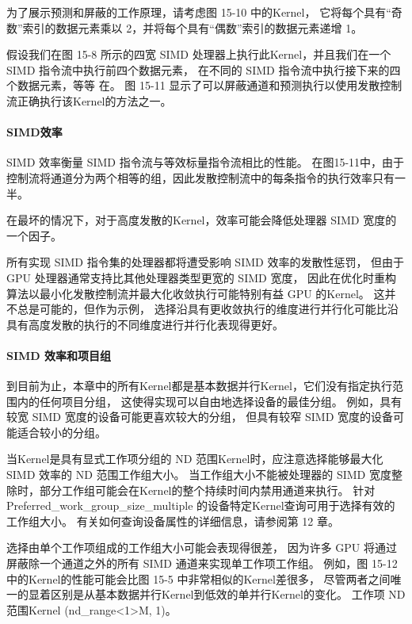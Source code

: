 为了展示预测和屏蔽的工作原理，请考虑图 15-10 中的Kernel，
它将每个具有“奇数”索引的数据元素乘以 2，并将每个具有“偶数”索引的数据元素递增 1。

假设我们在图 15-8 所示的四宽 SIMD 处理器上执行此Kernel，并且我们在一个 SIMD 指令流中执行前四个数据元素，
在不同的 SIMD 指令流中执行接下来的四个数据元素，等等 在。 
图 15-11 显示了可以屏蔽通道和预测执行以使用发散控制流正确执行该Kernel的方法之一。

\paragraph{SIMD效率}

SIMD 效率衡量 SIMD 指令流与等效标量指令流相比的性能。 
在图15-11中，由于控制流将通道分为两个相等的组，因此发散控制流中的每条指令的执行效率只有一半。

在最坏的情况下，对于高度发散的Kernel，效率可能会降低处理器 SIMD 宽度的一个因子。

所有实现 SIMD 指令集的处理器都将遭受影响 SIMD 效率的发散性惩罚，
但由于 GPU 处理器通常支持比其他处理器类型更宽的 SIMD 宽度，
因此在优化时重构算法以最小化发散控制流并最大化收敛执行可能特别有益 GPU 的Kernel。 
这并不总是可能的，但作为示例，
选择沿具有更收敛执行的维度进行并行化可能比沿具有高度发散的执行的不同维度进行并行化表现得更好。

\paragraph{SIMD 效率和项目组}

到目前为止，本章中的所有Kernel都是基本数据并行Kernel，它们没有指定执行范围内的任何项目分组，
这使得实现可以自由地选择设备的最佳分组。 例如，具有较宽 SIMD 宽度的设备可能更喜欢较大的分组，
但具有较窄 SIMD 宽度的设备可能适合较小的分组。

当Kernel是具有显式工作项分组的 ND 范围Kernel时，应注意选择能够最大化 SIMD 效率的 ND 范围工作组大小。 
当工作组大小不能被处理器的 SIMD 宽度整除时，部分工作组可能会在Kernel的整个持续时间内禁用通道来执行。 
针对 Preferred\_work\_group\_size\_multiple 的设备特定Kernel查询可用于选择有效的工作组大小。 
有关如何查询设备属性的详细信息，请参阅第 12 章。

选择由单个工作项组成的工作组大小可能会表现得很差，
因为许多 GPU 将通过屏蔽除一个通道之外的所有 SIMD 通道来实现单工作项工作组。 
例如，图 15-12 中的Kernel的性能可能会比图 15-5 中非常相似的Kernel差很多，
尽管两者之间唯一的显着区别是从基本数据并行Kernel到低效的单并行Kernel的变化。 
工作项 ND 范围Kernel (nd\_range<1>{M, 1})。

